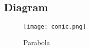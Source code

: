 \documentclass[journal,10pt,twocolumn]{article}
\begin{document}
\begin{flushleft}
\begin{flushleft}
\section{Diagram}
\begin{figure}[h]
\texttt{[image: conic.png]}
\caption{Parabola}
\label{fig:Parabola}
\end{figure}
\end{flushleft}
\end{flushleft}
\end{document}
